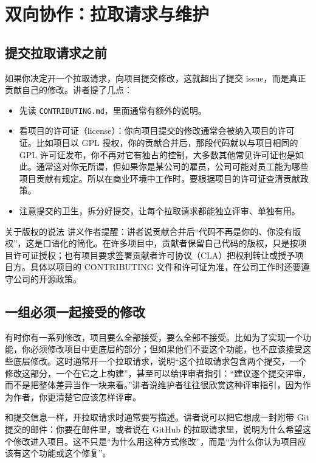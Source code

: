 \documentclass[a4paper]{article}
\begin{document}
\section{双向协作：拉取请求与维护}

\subsection{提交拉取请求之前}

如果你决定开一个拉取请求，向项目提交修改，这就超出了提交 issue，而是真正贡献自己的修改。讲者提了几点：
\begin{itemize}
\item 先读 \texttt{CONTRIBUTING.md}，里面通常有额外的说明。
\item 看项目的许可证（license）：你向项目提交的修改通常会被纳入项目的许可证。比如项目以 GPL 授权，你的贡献合并后，那段代码就以与项目相同的 GPL 许可证发布，你不再对它有独占的控制，大多数其他常见许可证也是如此。通常这对你无所谓，但如果你是某公司的雇员，公司可能对员工能为哪些项目贡献有规定。所以在商业环境中工作时，要根据项目的许可证查清贡献政策。
\item 注意提交的卫生，拆分好提交，让每个拉取请求都能独立评审、单独有用。
\end{itemize}

\begin{warningbox}{关于版权的说法}
讲义作者提醒：讲者说贡献合并后“代码不再是你的、你没有版权”，这是口语化的简化。在许多项目中，贡献者保留自己代码的版权，只是按项目许可证授权；也有项目要求签署贡献者许可协议（CLA）把权利转让或授予项目方。具体以项目的 CONTRIBUTING 文件和许可证为准，在公司工作时还要遵守公司的开源政策。
\end{warningbox}

\subsection{一组必须一起接受的修改}

有时你有一系列修改，项目要么全部接受，要么全部不接受。比如为了实现一个功能，你必须修改项目中更底层的部分；但如果他们不要这个功能，也不应该接受这些底层修改。这时通常开一个拉取请求，说明“这个拉取请求包含两个提交，一个修改这部分，一个在它之上构建”，甚至可以给评审者指引：“建议逐个提交评审，而不是把整体差异当作一块来看。”讲者说维护者往往很欣赏这种评审指引，因为作为作者，你更清楚它应该怎样评审。

和提交信息一样，开拉取请求时通常要写描述。讲者说可以把它想成一封附带 Git 提交的邮件：你要在邮件里，或者说在 GitHub 的拉取请求里，说明为什么希望这个修改进入项目。这不只是“为什么用这种方式修改”，而是“为什么你认为项目应该有这个功能或这个修复”。
\end{document}
